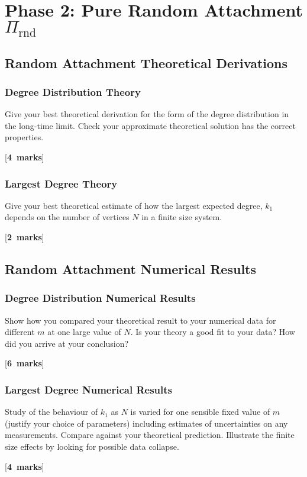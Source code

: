 \documentclass[a4paper,12pt]{article}
\newcounter{nmarks}
\newcommand{\qmarks}[1]{\addtocounter{nmarks}{#1} }
\renewcommand{\qmarks}[1]{\addtocounter{nmarks}{#1} \hspace*{\fill} [\textbf{#1~marks}]}
\begin{document}
\section{Phase 2: Pure Random Attachment $\Pi_\mathrm{rnd}$}



\subsection{Random Attachment Theoretical Derivations}


\subsubsection{Degree Distribution Theory}
Give your best theoretical derivation for the form of the degree distribution in the long-time limit. Check your approximate theoretical solution has the correct properties. \qmarks{4}

\subsubsection{Largest Degree Theory}
Give your best theoretical estimate of how the largest expected degree, $k_\mathrm{1}$ 
depends on the number of vertices $N$ in a finite size system. \qmarks{2}

\subsection{Random Attachment Numerical Results}

\subsubsection{Degree Distribution Numerical Results}
Show how you compared your theoretical result to your numerical data for different $m$ at one large value of $N$.  Is your theory a good fit to your data? How did you arrive at your conclusion?  \qmarks{6}

\subsubsection{Largest Degree Numerical Results}
Study of the behaviour of $k_1$ as $N$ is varied for one sensible fixed value of $m$ (justify your choice of parameters) including estimates of uncertainties on any measurements. Compare against your theoretical prediction. Illustrate the finite size effects by looking for possible data collapse.
\qmarks{4}
\end{document}
